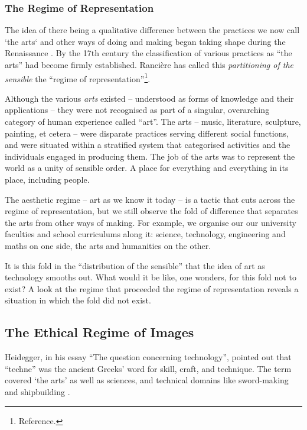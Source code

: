 \documentclass[letter:wpaper]{article}
\begin{document}
    \subsubsection{The Regime of Representation}

    The idea of there being a qualitative difference between the practices we now call ‘the arts‘ and other ways of doing and making began taking shape during the Renaissance \citep[p.136]{TatarkiewiczWhtIsArt1971}. By the 17th century the classification of various practices as ``the arts'' had become firmly established. Rancière has called this \emph{partitioning of the sensible} the ``regime of representation''\footnote{
        Reference.
    }.
    
    Although the various \emph{arts} existed – understood as forms of knowledge and their applications – they were not recognised as part of a singular, overarching category of human experience called ``art''. The arts – music, literature, sculpture, painting, et cetera – were disparate practices serving different social functions, and were situated within a stratified system that categorised activities and the individuals engaged in producing them. The job of the arts was to represent the world as a unity of sensible order. A place for everything and everything in its place, including people.
    
    The aesthetic regime -- art as we know it today -- is a tactic that cuts across the regime of representation, but we still observe the fold of difference that separates the arts from other ways of making. For example, we organise our our university faculties and school curriculums along it: science, technology, engineering and maths on one side, the arts and humanities on the other. 
    
    It is this fold in the ``distribution of the sensible'' \citep[p.42]{RancierPltcsOfThAsthtcs2004} that the idea of art as technology smooths out. What would it be like, one wonders, for this fold not to exist?  A look at the regime that proceeded the regime of representation reveals a situation in which the fold did not exist.
    
    \subsection{The Ethical Regime of Images}

    Heidegger, in his essay ``The question concerning technology'', pointed out that ``techne'' was the ancient Greeks' word for skill, craft, and technique. The term covered ‘the arts’ as well as sciences, and technical domains like sword-making and shipbuilding \citep[p34]{HeideggerThQstnCncrngTchnlgy1954}.
    
\end{document}
